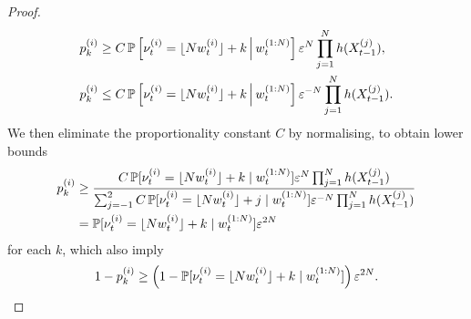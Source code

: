 \begin{proof}
\begin{align*}
p_k^{(i)}
&\geq C \, \mathbb{P} \left[ \nu_t^{(i)} = \lfloor N w_t^{(i)} \rfloor + k \,\middle|\, w_t^{(1:N)} \right] \varepsilon^N
        \prod_{j=1}^N h(X_{t-1}^{(j)}) , \\
p_k^{(i)}
&\leq C \, \mathbb{P} \left[ \nu_t^{(i)} = \lfloor N w_t^{(i)} \rfloor + k \,\middle|\, w_t^{(1:N)} \right] 
        \varepsilon^{-N} \prod_{j=1}^N h(X_{t-1}^{(j)}) .
\end{align*}
We then eliminate the proportionality constant $C$ by normalising, to obtain lower bounds
\begin{align}
p_k^{(i)} 
&\geq \frac{ C \, \mathbb{P} [ \nu_t^{(i)} = \lfloor N w_t^{(i)} \rfloor + k \mid w_t^{(1:N)} ] 
        \varepsilon^N \prod_{j=1}^N h(X_{t-1}^{(j)}) }{
        \sum_{j=-1}^2 C \, \mathbb{P} [ \nu_t^{(i)} = \lfloor N w_t^{(i)} \rfloor + j \mid w_t^{(1:N)} ] 
        \varepsilon^{-N} \prod_{j=1}^N h(X_{t-1}^{(j)}) } \notag\\
&= \mathbb{P} [ \nu_t^{(i)} = \lfloor N w_t^{(i)} \rfloor + k \mid w_t^{(1:N)} ] \varepsilon^{2N} 
        \label{eq:strat_pbounds}
\end{align}
for each $k$, which also imply
\begin{equation}
1 - p_k^{(i)} 
\geq \left( 1- \mathbb{P} [ \nu_t^{(i)} = \lfloor N w_t^{(i)} \rfloor + k \mid w_t^{(1:N)} ] \right)
        \varepsilon^{2N} . \label{eq:strat_nonpbounds}
\end{equation}


\end{proof}
